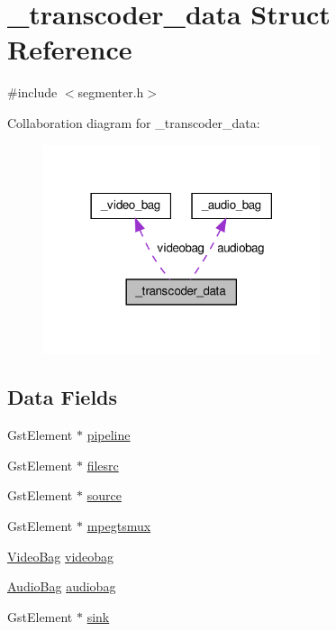 \hypertarget{struct__transcoder__data}{\section{\-\_\-transcoder\-\_\-data \-Struct \-Reference}
\label{struct__transcoder__data}
}


{\ttfamily \#include $<$segmenter.\-h$>$}



\-Collaboration diagram for \-\_\-transcoder\-\_\-data\-:\nopagebreak
\begin{figure}[H]
\begin{center}
\leavevmode
\includegraphics[width=230pt]{struct__transcoder__data__coll__graph}
\end{center}
\end{figure}
\subsection*{\-Data \-Fields}
\begin{DoxyCompactItemize}
\item 
\-Gst\-Element $\ast$ \hyperlink{struct__transcoder__data_a310ff227733a8a01cb68a9af5e132751}{pipeline}
\item 
\-Gst\-Element $\ast$ \hyperlink{struct__transcoder__data_a650b27f093557fcea9f53f432c7724cf}{filesrc}
\item 
\-Gst\-Element $\ast$ \hyperlink{struct__transcoder__data_a258d0be8d8f4992e7579e31c12e06078}{source}
\item 
\-Gst\-Element $\ast$ \hyperlink{struct__transcoder__data_aa67a91cfc1bc02fc307178ef4f35df14}{mpegtsmux}
\item 
\hyperlink{segmenter_8h_a6f94543709a46b063bd7fb0817acfe0e}{\-Video\-Bag} \hyperlink{struct__transcoder__data_aceb5b4e8609bbec3bf57e52a7f4d865a}{videobag}
\item 
\hyperlink{segmenter_8h_a91a772b808e575d8b4da9b8e9f3c8cfc}{\-Audio\-Bag} \hyperlink{struct__transcoder__data_a27c753df9dd609802e4649f4be7e64e7}{audiobag}
\item 
\-Gst\-Element $\ast$ \hyperlink{struct__transcoder__data_a92b8e1a70279c8c57514246bcea2a6c0}{sink}
\end{DoxyCompactItemize}


